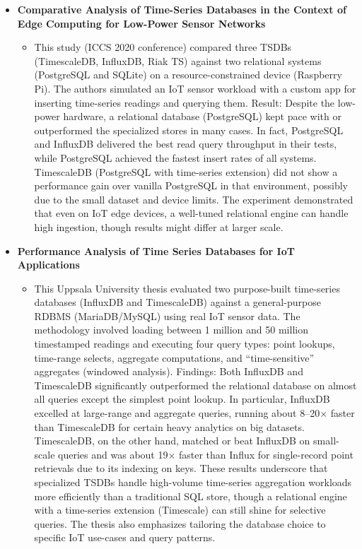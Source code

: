 \documentclass[11pt]{article}
\begin{document}
\begin{itemize}
    \item[] \textbf{Comparative Analysis of Time-Series Databases in the Context of Edge Computing for Low-Power Sensor Networks}
    \begin{itemize}
        \item[] This study (ICCS 2020 conference) compared three TSDBs (TimescaleDB, InfluxDB, Riak TS) against two relational systems (PostgreSQL and SQLite) on a resource-constrained device (Raspberry Pi). The authors simulated an IoT sensor workload with a custom app for inserting time-series readings and querying them. Result: Despite the low-power hardware, a relational database (PostgreSQL) kept pace with or outperformed the specialized stores in many cases. In fact, PostgreSQL and InfluxDB delivered the best read query throughput in their tests, while PostgreSQL achieved the fastest insert rates of all systems. TimescaleDB (PostgreSQL with time-series extension) did not show a performance gain over vanilla PostgreSQL in that environment, possibly due to the small dataset and device limits. The experiment demonstrated that even on IoT edge devices, a well-tuned relational engine can handle high ingestion, though results might differ at larger scale. 
    \end{itemize}
    \item[] \textbf{Performance Analysis of Time Series Databases for IoT Applications}
    \begin{itemize}
        \item[] This Uppsala University thesis evaluated two purpose-built time-series databases (InfluxDB and TimescaleDB) against a general-purpose RDBMS (MariaDB/MySQL) using real IoT sensor data. The methodology involved loading between 1 million and 50 million timestamped readings and executing four query types: point lookups, time-range selects, aggregate computations, and “time-sensitive” aggregates (windowed analysis). Findings: Both InfluxDB and TimescaleDB significantly outperformed the relational database on almost all queries except the simplest point lookup. In particular, InfluxDB excelled at large-range and aggregate queries, running about 8–20× faster than TimescaleDB for certain heavy analytics on big datasets. TimescaleDB, on the other hand, matched or beat InfluxDB on small-scale queries and was about 19× faster than Influx for single-record point retrievals due to its indexing on keys. These results underscore that specialized TSDBs handle high-volume time-series aggregation workloads more efficiently than a traditional SQL store, though a relational engine with a time-series extension (Timescale) can still shine for selective queries. The thesis also emphasizes tailoring the database choice to specific IoT use-cases and query patterns.

\end{itemize}
\end{itemize}
\end{document}
